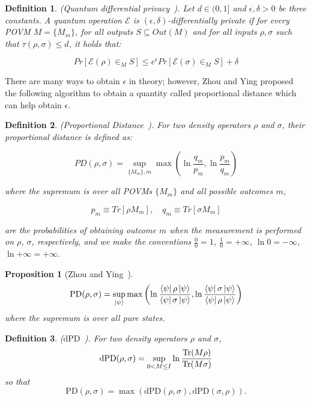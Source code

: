 \documentclass{ieeeaccess}
\newtheorem{definition}{Definition}[section]
\newtheorem{proposition}{Proposition}[section]
\begin{document}
\begin{definition}
    (Quantum differential privacy~\cite{zhou2017differential}). Let $d \in (0,1]$ and $\epsilon,\delta > 0$ be three constants. A quantum operation $\mathcal{E}$ is $(\epsilon, \delta)$-differentially private if for every POVM $M = \{M_m\}$, for all outputs $S \subseteq Out(M)$ and for all inputs $\rho, \sigma$ such that $\tau(\rho, \sigma)\leq d$, it holds that:

    \[
      Pr[\mathcal{E}(\rho)\in_{M}S] \leq e^{\epsilon} Pr[\mathcal{E}(\sigma)\in_{M}S] + \delta
    \]
    \label{def:qdp}
\end{definition}

There are many ways to obtain $\epsilon$ in theory; however, Zhou and Ying proposed the following algorithm to obtain a quantity called proportional distance which can help obtain $\epsilon$.

\begin{definition}
    (Proportional Distance~\cite{zhou2017differential}). For two density operators $\rho$ and $\sigma$, their proportional distance is defined as:

    \[
      PD(\rho, \sigma) = \sup_{\{M_m\}, m} \max\left(\ln\frac{q_m}{p_m}, \ln\frac{p_m}{q_m}\right)
    \]

    where the supremum is over all POVMs $\{M_m\}$ and all possible outcomes $m$,

    \[
      p_m \equiv Tr[\rho M_m], \quad q_m \equiv Tr[\sigma M_m]
    \]

    are the probabilities of obtaining outcome $m$ when the measurement is performed on $\rho$, $\sigma$, respectively, and we make the conventions $\frac{0}{0} = 1$, $\frac{1}{0} = +\infty$, $\ln 0 = -\infty$, $\ln{+\infty} = +\infty$.
    \label{def:proportional_distance}
\end{definition}



\begin{proposition}[Zhou and Ying~\cite{zhou2017differential}]
    \[
      \mathrm{PD}(\rho, \sigma) = \sup_{\ket{\psi}} \max\left(\ln\frac{\bra{\psi}\rho\ket{\psi}}{\bra{\psi}\sigma\ket{\psi}}, \ln\frac{\bra{\psi}\sigma\ket{\psi}}{\bra{\psi}\rho\ket{\psi}}\right)
    \]
    where the supremum is over all pure states.
    \label{prop:pd_pure_states}
\end{proposition}

\begin{definition}
    ($\mathrm{dPD}$~\cite{zhou2017differential}). For two density operators $\rho$ and $\sigma$,
    \[
      \mathrm{dPD}(\rho, \sigma) = \sup_{0 < M \leq I} \ln\frac{\Tr(M\rho)}{\Tr(M\sigma)}
    \]
    so that
    \begin{equation}
      \mathrm{PD}(\rho, \sigma) = \max\left(\mathrm{dPD}(\rho, \sigma), \mathrm{dPD}(\sigma, \rho)\right).
      \label{eq:pd_dpd}
    \end{equation}
    \label{def:dpd}
\end{definition}
\end{document}
